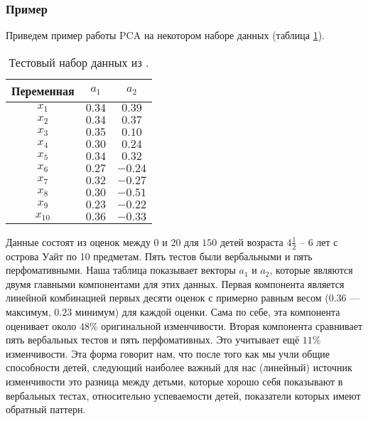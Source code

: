 \subsubsection*{Пример}
Приведем пример работы PCA на некотором наборе данных (таблица \ref{tab:pca-example}).

\begin{table}[h]
    \begin{center}
        \begin{tabular}{ |c|c|c| } 
            \hline
            Переменная & $a_1$ & $a_2$ \\ 
            \hline
            $x_1$ & $0.34$ & $0.39$ \\ 
            \hline
            $x_2$ & $0.34$ & $0.37$ \\ 
            \hline
            $x_3$ & $0.35$ & $0.10$ \\ 
            \hline
            $x_4$ & $0.30$ & $0.24$ \\ 
            \hline
            $x_5$ & $0.34$ & $0.32$ \\ 
            \hline
            $x_6$ & $0.27$ & $-0.24$ \\ 
            \hline
            $x_7$ & $0.32$ & $-0.27$ \\ 
            \hline
            $x_8$ & $0.30$ & $-0.51$ \\ 
            \hline
            $x_9$ & $0.23$ & $-0.22$ \\ 
            \hline
            $x_{10}$ & $0.36$ & $-0.33$ \\ 
            \hline
        \end{tabular}
    \end{center}
    \caption{Тестовый набор данных из \cite{pca}.}
    \label{tab:pca-example}
\end{table}

Данные состоят из оценок между $0$ и $20$ для $150$ детей возраста $4 \frac{1}{2}$ -- $6$ лет с острова Уайт по 10 предметам. 
Пять тестов были вербальными и пять перфомативными.
Наша таблица показывает векторы $a_1$ и $a_2$, которые являются двумя главными компонентами для этих данных. 
Первая компонента является линейной комбинацией первых десяти оценок с примерно равным весом ($0.36$ --- максимум, $0.23$ минимум) для каждой оценки. 
Сама по себе, эта компонента оценивает около $48\%$ оригинальной изменчивости. 
Вторая компонента сравнивает пять вербальных тестов и пять перфомативных. 
Это учитывает ещё $11\%$ изменчивости. 
Эта форма говорит нам, что после того как мы учли общие способности детей, следующий наиболее важный для нас (линейный) источник изменчивости это разница между детьми, которые хорошо себя показывают в вербальных тестах, относительно успеваемости детей, показатели которых имеют обратный паттерн.
